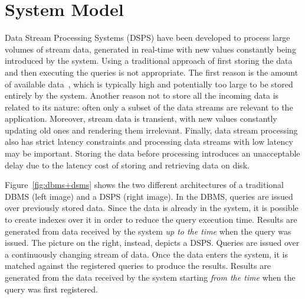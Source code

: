 \section{System Model}

Data Stream Processing Systems (DSPS) have been developed to process large volumes of stream data,
generated in real-time with new values constantly being introduced by the system. Using a traditional
approach of first storing the data and then executing the queries is not appropriate.
The first reason is the amount of available data~\cite{design-principles, 8-reqs}, which is typically
high and potentially too large to be stored entirely by the system.
Another reason not to store all the incoming data is related to its nature: often only a subset of
the data streams are relevant to the application.
Moreover, stream data is transient, with new values constantly updating old ones and rendering
them irrelevant.
Finally, data stream processing also has strict latency constraints and processing data streams with low
latency may be important. Storing the data before processing introduces an unacceptable
delay due to the latency cost of storing and retrieving data on disk.

Figure~\ref{fig:dbms+dsms} shows the two different architectures of a traditional
DBMS (left image) and a DSPS (right image). In the DBMS, queries are issued over previously stored data.
Since the data is already in the system, it is possible to create indexes over it in order to reduce the
query execution time. Results are generated from data received by the system \emph{up to the time} when
the query was issued. The picture on the right, instead, depicts a DSPS. Queries are issued over a
continuously changing stream of data. Once the data enters the system, it is matched against the
registered queries to produce the results. Results are generated from the data received by the system
starting \emph{from the time} when the query was first registered.

